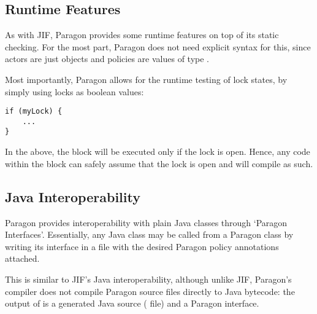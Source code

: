 \subsection{Runtime Features}

As with JIF, Paragon provides some runtime features on top of its static checking. For the most part, Paragon does not need explicit syntax for this, since actors are just objects and policies are values of type .

Most importantly, Paragon allows for the runtime testing of lock states, by simply using locks as boolean values:

\begin{verbatim}
if (myLock) {
	...
}
\end{verbatim}

In the above, the block will be executed only if the lock  is open. Hence, any code within the block can safely assume that the lock is open and will compile as such.

\subsection{Java Interoperability}

Paragon provides interoperability with plain Java classes through `Paragon Interfaces'. Essentially, any Java class may be called from a Paragon class by writing its interface in a  file with the desired Paragon policy annotations attached.

This is similar to JIF's Java interoperability, although unlike JIF, Paragon's compiler does not compile Paragon source files directly to Java bytecode: the output of  is a generated Java source ( file) and a  Paragon interface.

